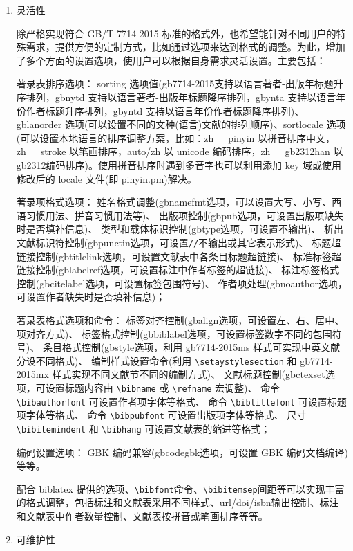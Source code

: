 \documentclass[11pt]{article} %
\begin{document}
\begin{enumerate}
  \item 灵活性

除严格实现符合 GB/T 7714-2015 标准的格式外，也希望能针对不同用户的特殊需求，提供方便的定制方式，比如通过选项来达到格式的调整。为此，增加了多个方面的设置选项，使用户可以根据自身需求灵活设置。主要包括：

著录表排序选项：
sorting 选项值(gb7714-2015支持以语言著者-出版年标题升序排列，gbnytd 支持以语言著者-出版年标题降序排列，gbynta 支持以语言年份作者标题升序排列，gbyntd 支持以语言年份作者标题降序排列)、gblanorder 选项(可以设置不同的文种(语言)文献的排列顺序)、sortlocale 选项(可以设置本地语言的排序调整方案，比如：zh\_\_pinyin 以拼音排序中文，zh\_\_stroke 以笔画排序，auto/zh 以 unicode 编码排序，zh\_\_gb2312han 以gb2312编码排序)。使用拼音排序时遇到多音字也可以利用添加 key 域或使用修改后的 locale 文件(即 pinyin.pm)解决。


著录项格式选项：
姓名格式调整(gbnamefmt选项，可以设置大写、小写、西语习惯用法、拼音习惯用法等)、
出版项控制(gbpub选项，可设置出版项缺失时是否填补信息)、
类型和载体标识控制(gbtype选项，可设置不输出)、
析出文献标识符控制(gbpunctin选项，可设置\texttt{//}不输出或其它表示形式)、
标题超链接控制(gbtitlelink选项，可设置文献表中各条目标题超链接)、
标准标签超链接控制(gblabelref选项，可设置标注中作者标签的超链接)、
标注标签格式控制(gbcitelabel选项，可设置标签包围符号)、
作者项处理(gbnoauthor选项，可设置作者缺失时是否填补信息)；

著录表格式选项和命令：
标签对齐控制(gbalign选项，可设置左、右、居中、项对齐方式)、
标签格式控制(gbbiblabel选项，可设置标签数字不同的包围符号)、
条目格式控制(gbstyle选项，利用 gb7714-2015ms 样式可实现中英文献分设不同格式)、
编制样式设置命令(利用 \verb|\setaystylesection| 和 gb7714-2015mx 样式实现不同文献节不同的编制方式)、
文献标题控制(gbctexset选项，可设置标题内容由 \verb|\bibname| 或 \verb|\refname| 宏调整)、
命令 \verb|\bibauthorfont| 可设置作者项字体等格式、
命令 \verb|\bibtitlefont| 可设置标题项字体等格式、
命令 \verb|\bibpubfont| 可设置出版项字体等格式、
尺寸 \verb|\bibitemindent| 和 \verb|\bibhang| 可设置文献表的缩进等格式；

编码设置选项：
GBK 编码兼容(gbcodegbk选项，可设置 GBK 编码文档编译)等等。

配合 biblatex 提供的选项、\verb|\bibfont|命令、\verb|\bibitemsep|间距等可以实现丰富的格式调整，包括标注和文献表采用不同样式、url/doi/isbn输出控制、标注和文献表中作者数量控制、文献表按拼音或笔画排序等等。


  \item 可维护性


\end{enumerate}
\end{document}
